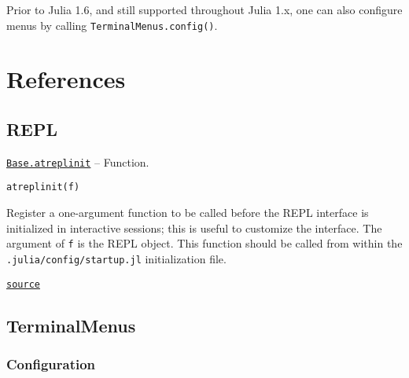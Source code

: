 Prior to Julia 1.6, and still supported throughout Julia 1.x, one can also configure menus by calling \texttt{TerminalMenus.config()}.



\hypertarget{13487828328085508990}{}


\section{References}



\hypertarget{2420424062759544635}{}


\subsection{REPL}


\hypertarget{1741947168860119796}{}
\hyperlink{1741947168860119796}{\texttt{Base.atreplinit}}  -- {Function.}

\begin{adjustwidth}{2em}{0pt}


\begin{verbatim}
atreplinit(f)
\end{verbatim}

Register a one-argument function to be called before the REPL interface is initialized in interactive sessions; this is useful to customize the interface. The argument of \texttt{f} is the REPL object. This function should be called from within the \texttt{.julia/config/startup.jl} initialization file.



\href{https://github.com/JuliaLang/julia/blob/9058264a69f9efc1af805c4473c946f87859b731/base/client.jl#L323-L330}{\texttt{source}}


\end{adjustwidth}

\hypertarget{11431304023302050160}{}


\subsection{TerminalMenus}



\hypertarget{11369986377061669582}{}


\subsubsection{Configuration}


